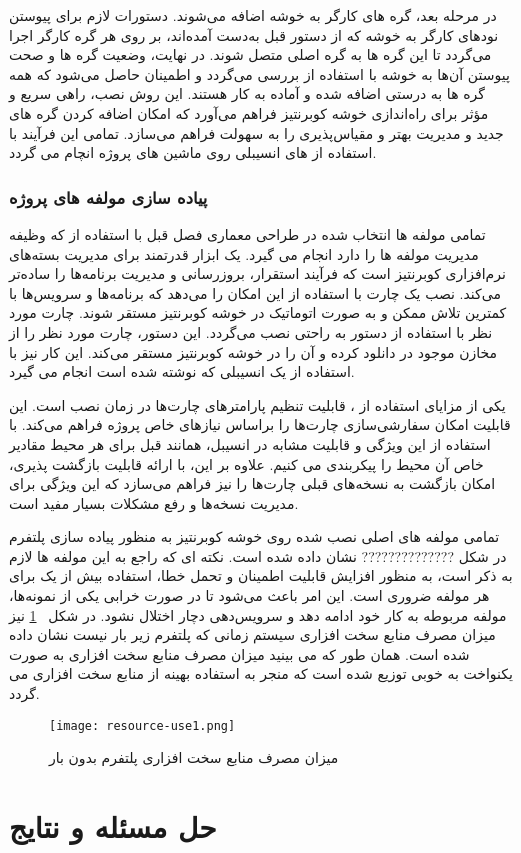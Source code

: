 در مرحله بعد، گره های کارگر به خوشه اضافه می‌شوند. دستورات لازم برای پیوستن نودهای کارگر به خوشه که از دستور قبل به‌دست آمده‌اند، بر روی هر گره کارگر اجرا می‌گردد تا این گره ها به گره اصلی متصل شوند. در نهایت، وضعیت گره ها و صحت پیوستن آن‌ها به خوشه با استفاده از  بررسی می‌گردد و اطمینان حاصل می‌شود که همه گره ها به درستی اضافه شده و آماده به کار هستند. این روش نصب، راهی سریع و مؤثر برای راه‌اندازی خوشه کوبرنتیز فراهم می‌آورد که امکان اضافه کردن گره  های جدید و مدیریت بهتر و مقیاس‌پذیری را به سهولت فراهم می‌سازد. تمامی این فرآیند با استفاده از  های انسیبلی روی ماشین های پروژه انچام می گردد.

\subsubsection{پیاده سازی مولفه های پروژه}
تمامی مولفه ها انتخاب شده در طراحی معماری فصل قبل با استفاده از  که وظیفه مدیریت مولفه ها را دارد انجام می گیرد.  یک ابزار قدرتمند برای مدیریت بسته‌های نرم‌افزاری کوبرنتیز است که فرآیند استقرار، بروزرسانی و مدیریت برنامه‌ها را ساده‌تر می‌کند. نصب یک چارت با استفاده از  این امکان را می‌دهد که برنامه‌ها و سرویس‌ها با کمترین تلاش ممکن و به صورت اتوماتیک در خوشه کوبرنتیز مستقر شوند. چارت مورد نظر با استفاده از دستور  به راحتی نصب می‌گردد. این دستور، چارت مورد نظر را از مخازن موجود در  دانلود کرده و آن را در خوشه کوبرنتیز مستقر می‌کند. این کار نیز با استفاده از یک  انسیبلی که نوشته شده است انجام می گیرد. 

یکی از مزایای استفاده از ، قابلیت تنظیم پارامترهای چارت‌ها در زمان نصب است. این قابلیت امکان سفارشی‌سازی چارت‌ها را براساس نیازهای خاص پروژه فراهم می‌کند. با استفاده از این ویژگی و قابلیت مشابه در انسیبل، همانند قبل برای هر محیط مقادیر خاص آن محیط را پیکربندی می کنیم. علاوه بر این،  با ارائه قابلیت بازگشت پذیری، امکان بازگشت به نسخه‌های قبلی چارت‌ها را نیز فراهم می‌سازد که این ویژگی برای مدیریت نسخه‌ها و رفع مشکلات بسیار مفید است. 

تمامی مولفه های اصلی نصب شده روی خوشه کوبرنتیز به منظور پیاده سازی پلتفرم  در شکل
??????????????
 نشان داده شده است. نکته ای که راجع به این مولفه ها لازم به ذکر است، به منظور افزایش قابلیت اطمینان و تحمل خطا، استفاده بیش از یک  برای هر مولفه ضروری است. این امر باعث می‌شود تا در صورت خرابی یکی از نمونه‌ها، مولفه مربوطه به کار خود ادامه دهد و سرویس‌دهی دچار اختلال نشود.
در شکل 
~\ref{fig: resource use no load}
نیز میزان مصرف منابع سخت افزاری سیستم زمانی که پلتفرم زیر بار نیست نشان داده شده است. همان طور که می بینید میزان مصرف منابع سخت افزاری به صورت یکنواخت به خوبی توزیع شده است که منجر به استفاده بهینه از منابع سخت افزاری می گردد.

\begin{figure}[!b]
	\centering
	\texttt{[image: resource-use1.png]}
	\caption{میزان مصرف منابع سخت افزاری پلتفرم بدون بار}
	\label{fig: resource use no load}
\end{figure}
\clearpage
\section{حل مسئله و نتایج}


